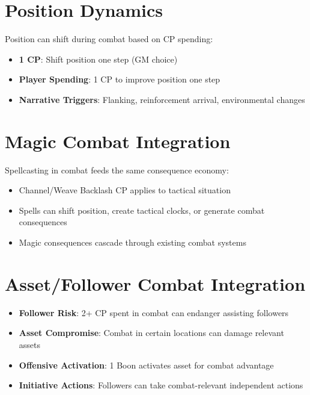\section{Position Dynamics}
Position can shift during combat based on CP spending:
\begin{itemize}
    \item \textbf{1 CP}: Shift position one step (GM choice)
    \item \textbf{Player Spending}: 1 CP to improve position one step
    \item \textbf{Narrative Triggers}: Flanking, reinforcement arrival, environmental changes
\end{itemize}

\section{Magic Combat Integration}
Spellcasting in combat feeds the same consequence economy:
\begin{itemize}
    \item Channel/Weave Backlash CP applies to tactical situation
    \item Spells can shift position, create tactical clocks, or generate combat consequences
    \item Magic consequences cascade through existing combat systems
\end{itemize}

\section{Asset/Follower Combat Integration}
\begin{itemize}
    \item \textbf{Follower Risk}: 2+ CP spent in combat can endanger assisting followers
    \item \textbf{Asset Compromise}: Combat in certain locations can damage relevant assets  
    \item \textbf{Offensive Activation}: 1 Boon activates asset for combat advantage
    \item \textbf{Initiative Actions}: Followers can take combat-relevant independent actions
\end{itemize}

